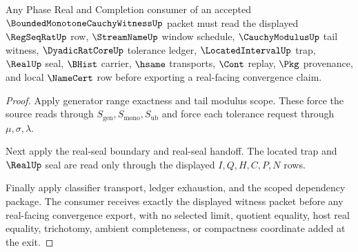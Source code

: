 \begin{theorem}
\label{thm:bounded-monotone-cauchy-witness-l10-exit-consumer-package}
Any Phase Real and Completion consumer of an accepted $\BoundedMonotoneCauchyWitnessUp$ packet must read the displayed $\RegSeqRatUp$ row, $\StreamNameUp$ window schedule, $\CauchyModulusUp$ tail witness, $\DyadicRatCoreUp$ tolerance ledger, $\LocatedIntervalUp$ trap, $\RealUp$ seal, $\BHist$ carrier, $\hsame$ transports, $\Cont$ replay, $\Pkg$ provenance, and local $\NameCert$ row before exporting a real-facing convergence claim.
\end{theorem}
\begin{proof}
Apply generator range exactness and tail modulus scope. These force the source reads through $S_{\mathrm{gen}},S_{\mathrm{mono}},S_{\mathrm{ub}}$ and force each tolerance request through $\mu,\sigma,\lambda$.

Next apply the real-seal boundary and real-seal handoff. The located trap and $\RealUp$ seal are read only through the displayed $I,Q,H,C,P,N$ rows.

Finally apply classifier transport, ledger exhaustion, and the scoped dependency package. The consumer receives exactly the displayed witness packet before any real-facing convergence export, with no selected limit, quotient equality, host real equality, trichotomy, ambient completeness, or compactness coordinate added at the exit.
\end{proof}

